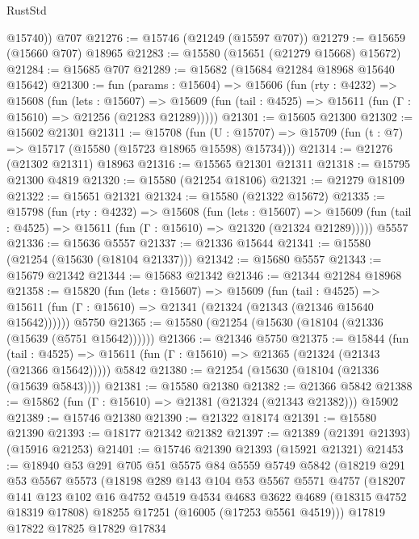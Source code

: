 \begin{lexlean}{RustStd}
\begin{coremodule}
        @15740))
    @707
@21276 := @15746 (@21249 (@15597 @707))
@21279 := @15659 (@15660 @707) @18965
@21283 := @15580 (@15651 (@21279 @15668) @15672)
@21284 := @15685 @707
@21289 := @15682 (@15684 @21284 @18968 @15640 @15642)
@21300 := fun (params : @15604) =>
  @15606
    (fun (rty : @4232) =>
    @15608
      (fun (lets : @15607) =>
      @15609 (fun (tail : @4525) => @15611 (fun (Γ : @15610) => @21256 (@21283 @21289)))))
@21301 := @15605 @21300
@21302 := @15602 @21301
@21311 := @15708
    (fun (U : @15707) => @15709 (fun (t : @7) => @15717 (@15580 (@15723 @18965 @15598) @15734)))
@21314 := @21276 (@21302 @21311) @18963
@21316 := @15565 @21301 @21311
@21318 := @15795 @21300 @4819
@21320 := @15580 (@21254 @18106)
@21321 := @21279 @18109
@21322 := @15651 @21321
@21324 := @15580 (@21322 @15672)
@21335 := @15798
    (fun (rty : @4232) =>
    @15608
      (fun (lets : @15607) =>
      @15609 (fun (tail : @4525) => @15611 (fun (Γ : @15610) => @21320 (@21324 @21289)))))
    @5557
@21336 := @15636 @5557
@21337 := @21336 @15644
@21341 := @15580 (@21254 (@15630 (@18104 @21337)))
@21342 := @15680 @5557
@21343 := @15679 @21342
@21344 := @15683 @21342
@21346 := @21344 @21284 @18968
@21358 := @15820
    (fun (lets : @15607) =>
    @15609
      (fun (tail : @4525) =>
      @15611 (fun (Γ : @15610) => @21341 (@21324 (@21343 (@21346 @15640 @15642))))))
    @5750
@21365 := @15580 (@21254 (@15630 (@18104 (@21336 (@15639 (@5751 @15642))))))
@21366 := @21346 @5750
@21375 := @15844
    (fun (tail : @4525) => @15611 (fun (Γ : @15610) => @21365 (@21324 (@21343 (@21366 @15642)))))
    @5842
@21380 := @21254 (@15630 (@18104 (@21336 (@15639 @5843))))
@21381 := @15580 @21380
@21382 := @21366 @5842
@21388 := @15862 (fun (Γ : @15610) => @21381 (@21324 (@21343 @21382))) @15902
@21389 := @15746 @21380
@21390 := @21322 @18174
@21391 := @15580 @21390
@21393 := @18177 @21342 @21382
@21397 := @21389 (@21391 @21393) (@15916 @21253)
@21401 := @15746 @21390 @21393 (@15921 @21321)
@21453 := @18940
    @53
    @291
    @705
    @51
    @5575
    @84
    @5559
    @5749
    @5842
    (@18219
      @291
      @53
      @5567
      @5573
      (@18198
        @289
        @143
        @104
        @53
        @5567
        @5571
        @4757
        (@18207
          @141
          @123
          @102
          @16
          @4752
          @4519
          @4534
          @4683
          @3622
          @4689
          (@18315 @4752 @18319 @17808)
          @18255
          @17251
          (@16005 (@17253 @5561 @4519)))
        @17819
        @17822
        @17825
        @17829
        @17834

\end{coremodule}
\end{lexlean}
